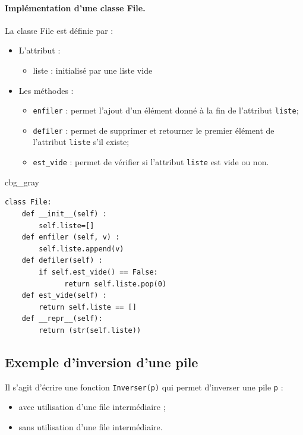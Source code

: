 \documentclass[%
oneside,                 %
final,                   %
10pt]{article}
\newenvironment{_cod_tight}[1]{
   \def\FrameCommand{\colorbox{#1}}
   \FrameRule0.6pt\MakeFramed {\FrameRestore}\vskip3mm}
   {\vskip0mm\endMakeFramed}
\newenvironment{cod}[1]{
\bgroup\rmfamily
\fboxsep=0mm\relax
\begin{_cod_tight}{#1}
\list{}{\parsep=-2mm\parskip=0mm\topsep=0pt\leftmargin=2mm
\rightmargin=2\leftmargin\leftmargin=4pt\relax}
\item\relax}
{\endlist\end{_cod_tight}\egroup}
\begin{document}
\paragraph{Implémentation d'une classe File.}
La classe File est définie par :
\begin{itemize}
\item L'attribut :
\begin{itemize}

 \item liste : initialisé par une liste vide

\end{itemize}

\noindent
\item Les méthodes :
\begin{itemize}

 \item \texttt{enfiler} : permet l'ajout d'un élément donné à la fin de l'attribut \texttt{liste};

 \item \texttt{defiler} : permet de supprimer et retourner le premier élément de l’attribut \texttt{liste} s’il existe;

 \item \Verb!est_vide! : permet de vérifier si l'attribut \texttt{liste} est vide ou non.
\end{itemize}

\noindent
\end{itemize}

\noindent
\begin{cod}{cbg_gray}\begin{verbatim}
class File:
    def __init__(self) :
        self.liste=[]
    def enfiler (self, v) :
        self.liste.append(v)
    def defiler(self) :
        if self.est_vide() == False:
              return self.liste.pop(0)
    def est_vide(self) :
        return self.liste == []
    def __repr__(self):
        return (str(self.liste))
\end{verbatim}
\end{cod}
\noindent

\subsection{Exemple d'inversion d'une pile}
Il s'agit d’écrire une fonction \texttt{Inverser(p)} qui permet d’inverser une pile \texttt{p} :
\begin{itemize}
\item avec utilisation d'une file intermédiaire ;

\item sans utilisation d'une file intermédiaire.
\end{itemize}
\end{document}
